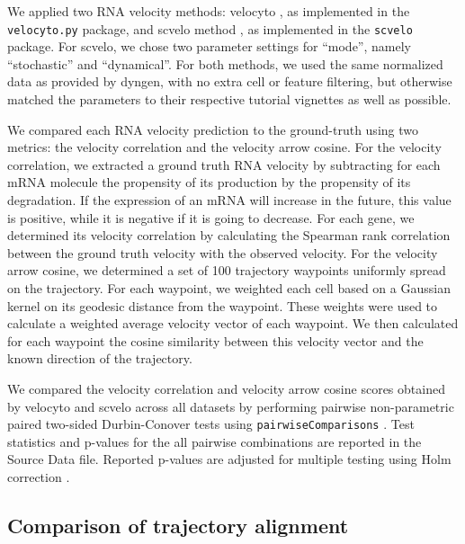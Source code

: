 \documentclass[
  table,
  10pt,
  a4paper]{article}
\begin{document}
We applied two RNA velocity methods: velocyto
\autocite{lamanno_rnavelocitysingle_2018}, as implemented in the
\texttt{velocyto.py} package, and scvelo method
\autocite{bergen_generalizingrnavelocity_2020}, as implemented in the
\texttt{scvelo} package. For scvelo, we chose two parameter settings for
``mode'', namely ``stochastic'' and ``dynamical''. For both methods, we
used the same normalized data as provided by dyngen, with no extra cell
or feature filtering, but otherwise matched the parameters to their
respective tutorial vignettes as well as possible.

We compared each RNA velocity prediction to the ground-truth using two
metrics: the velocity correlation and the velocity arrow cosine. For the
velocity correlation, we extracted a ground truth RNA velocity by
subtracting for each mRNA molecule the propensity of its production by
the propensity of its degradation. If the expression of an mRNA will
increase in the future, this value is positive, while it is negative if
it is going to decrease. For each gene, we determined its velocity
correlation by calculating the Spearman rank correlation between the
ground truth velocity with the observed velocity. For the velocity arrow
cosine, we determined a set of 100 trajectory waypoints uniformly spread
on the trajectory. For each waypoint, we weighted each cell based on a
Gaussian kernel on its geodesic distance from the waypoint. These
weights were used to calculate a weighted average velocity vector of
each waypoint. We then calculated for each waypoint the cosine
similarity between this velocity vector and the known direction of the
trajectory.

We compared the velocity correlation and velocity arrow cosine scores
obtained by velocyto and scvelo across all datasets by performing
pairwise non-parametric paired two-sided Durbin-Conover tests
\autocite{conover_multiplecomparisonsprocedures_1979} using
\texttt{pairwiseComparisons}
\autocite{patil_pairwisecomparisonsmultiplepairwise_2019}. Test
statistics and p-values for the all pairwise combinations are reported
in the Source Data file. Reported p-values are adjusted for multiple
testing using Holm correction
\autocite{holm_simplesequentiallyrejective_1979}.

\hypertarget{sec:dyngen-tacompare}{%
\subsection{Comparison of trajectory
alignment}\label{sec:dyngen-tacompare}}
\end{document}
